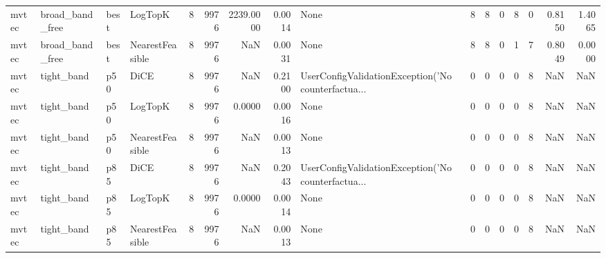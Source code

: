\begin{tabular}{llllrrrrlrrrrrrr}
  mvtec &      broad\_band\_free &   best &         LogTopK &            8 &                 9976 &                2239.0000 &      0.0014 &                                               None &      8 &            8 &        0 &              8 &          0 &             0.8150 &         1.4065 \\
  mvtec &      broad\_band\_free &   best & NearestFeasible &            8 &                 9976 &                      NaN &      0.0031 &                                               None &      8 &            8 &        0 &              1 &          7 &             0.8049 &         0.0000 \\
  mvtec &           tight\_band &    p50 &            DiCE &            8 &                 9976 &                      NaN &      0.2100 & UserConfigValidationException('No counterfactua... &      0 &            0 &        0 &              0 &          8 &                NaN &            NaN \\
  mvtec &           tight\_band &    p50 &         LogTopK &            8 &                 9976 &                   0.0000 &      0.0016 &                                               None &      0 &            0 &        0 &              0 &          8 &                NaN &            NaN \\
  mvtec &           tight\_band &    p50 & NearestFeasible &            8 &                 9976 &                      NaN &      0.0013 &                                               None &      0 &            0 &        0 &              0 &          8 &                NaN &            NaN \\
  mvtec &           tight\_band &    p85 &            DiCE &            8 &                 9976 &                      NaN &      0.2043 & UserConfigValidationException('No counterfactua... &      0 &            0 &        0 &              0 &          8 &                NaN &            NaN \\
  mvtec &           tight\_band &    p85 &         LogTopK &            8 &                 9976 &                   0.0000 &      0.0014 &                                               None &      0 &            0 &        0 &              0 &          8 &                NaN &            NaN \\
  mvtec &           tight\_band &    p85 & NearestFeasible &            8 &                 9976 &                      NaN &      0.0013 &                                               None &      0 &            0 &        0 &              0 &          8 &                NaN &            NaN \\

\end{tabular}
